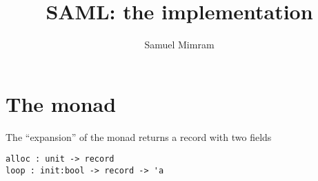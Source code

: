 \documentclass[a4paper]{article}
\title{SAML: the implementation}
\author{Samuel Mimram}
\begin{document}
\maketitle

\section{The monad}
The ``expansion'' of the monad returns a record  with two fields
\begin{verbatim}
alloc : unit -> record
loop : init:bool -> record -> 'a
\end{verbatim}
\end{document}
